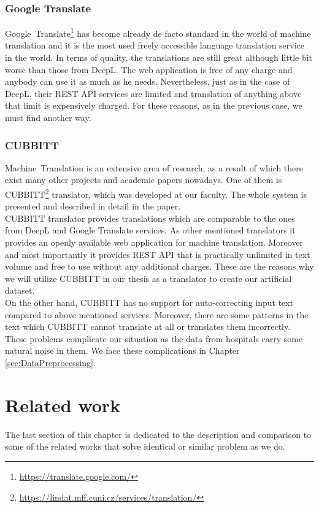 \subsubsection{Google Translate}
Google~Translate\footnote[12]{\url{https://translate.google.com/}} has become already de facto standard in the world of machine translation and it is the most used freely accessible language translation service in the world. In terms of quality, the translations are still great although little bit worse than those from DeepL. The web application is free of any charge and anybody can use it as much as he needs. Nevertheless, just as in the case of DeepL, their REST API services are limited and translation of anything above that limit is expensively charged. For these reasons, as in the previous case, we must find another way.

\subsubsection{CUBBITT}
\label{sec:Cubbitt}
Machine~Translation\citep{akhbardeh2021findings} is an extensive area of research, as a result of which there exist many other projects and academic papers nowadays. One of them is CUBBITT\footnote[13]{\url{https://lindat.mff.cuni.cz/services/translation/}} translator, which was developed at our faculty. The whole system is presented and described in detail in the \citet{biblio:PoToTransformingmachine2020} paper. \\

CUBBITT translator provides translations which are comparable to the ones from DeepL and Google Translate services. As other mentioned translators it provides an openly available web application for machine translation. Moreover and most importantly it provides REST API that is practically unlimited in text volume and free to use without any additional charges. These are the reasons why we will utilize CUBBITT in our thesis as a translator to create our artificial dataset.\\

On the other hand, CUBBITT has no support for auto-correcting input text compared to above mentioned services. Moreover, there are some patterns in the text which CUBBITT cannot translate at all or translates them incorrectly. These problems complicate our situation as the data from hospitals carry some natural noise in them. We face these complications in Chapter \ref{sec:DataPreprocessing}.

\section{Related work}
\label{sec:RelatedWork}
The last section of this chapter is dedicated to the description and comparison to some of the related works that solve identical or similar problem as we do.\\

